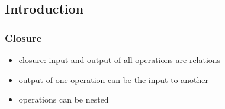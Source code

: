 \documentclass[dvipsnames]{beamer}
\theoremstyle{plain}
\begin{document}
\subsection{Introduction}

\begin{frame}
  \frametitle{Closure}

  \begin{itemize}
    \item \alert{closure}: input and output of all operations are relations

    \medskip
    \item output of one operation can be the input to another
    \item operations can be nested
  \end{itemize}
\end{frame}
\end{document}
